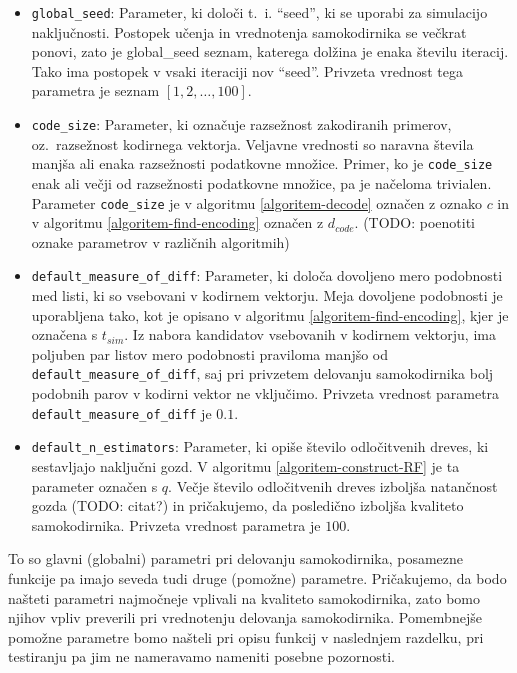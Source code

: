 \documentclass[12pt,a4paper]{article}
\begin{document}
\begin{itemize}
	\item \texttt{global\_seed}: Parameter, ki določi t.~i. ``seed'', ki se uporabi za simulacijo naključnosti.
	Postopek učenja in vrednotenja samokodirnika se večkrat ponovi, zato je global\_seed seznam, katerega dolžina je enaka številu iteracij.
	Tako ima postopek v vsaki iteraciji nov ``seed''. 
	Privzeta vrednost tega parametra je seznam $[1,2,\ldots,100]$.

	\item \texttt{code\_size}: Parameter, ki označuje razsežnost zakodiranih primerov, oz.\ razsežnost kodirnega vektorja. 
	Veljavne vrednosti so naravna števila manjša ali enaka razsežnosti podatkovne množice.
	Primer, ko je \texttt{code\_size} enak ali večji od razsežnosti podatkovne množice, pa je načeloma trivialen.
	Parameter \texttt{code\_size} je v algoritmu \ref{algoritem-decode} označen z oznako $c$ in v algoritmu \ref{algoritem-find-encoding} označen z $d_{code}$. 
	(TODO: poenotiti oznake parametrov v različnih algoritmih)
	
	\item \texttt{default\_measure\_of\_diff}: Parameter, ki določa dovoljeno mero podobnosti med listi, ki so vsebovani v kodirnem vektorju.
	Meja dovoljene podobnosti je uporabljena tako, kot je opisano v algoritmu \ref{algoritem-find-encoding}, kjer je označena s $t_{\mathit{sim}}$.
	Iz nabora kandidatov vsebovanih v kodirnem vektorju, ima poljuben par listov mero podobnosti praviloma manjšo od \texttt{default\_\-measure\_\-of\_\-diff}, 
	saj pri privzetem delovanju samokodirnika bolj podobnih parov v kodirni vektor ne vključimo.
	Privzeta vrednost parametra \texttt{default\_measure\_of\_diff} je $0.1$. %

	\item \texttt{default\_n\_estimators}: Parameter, ki opiše število odločitvenih dreves, ki sestavljajo naključni gozd. 
	V algoritmu \ref{algoritem-construct-RF} je ta parameter označen s $q$. 
	Večje število odločitvenih dreves izboljša natančnost gozda (TODO: citat?) in pričakujemo, da posledično izboljša kvaliteto samokodirnika.
	Privzeta vrednost parametra je $100$.

\end{itemize}

To so glavni (globalni) parametri pri delovanju samokodirnika, posamezne funkcije pa imajo seveda tudi druge (pomožne) parametre.
Pričakujemo, da bodo našteti parametri najmočneje vplivali na kvaliteto samokodirnika, zato bomo njihov vpliv preverili pri vrednotenju delovanja samokodirnika. 
Pomembnejše pomožne parametre bomo našteli pri opisu funkcij v naslednjem razdelku, pri testiranju pa jim ne nameravamo nameniti posebne pozornosti.
\end{document}
